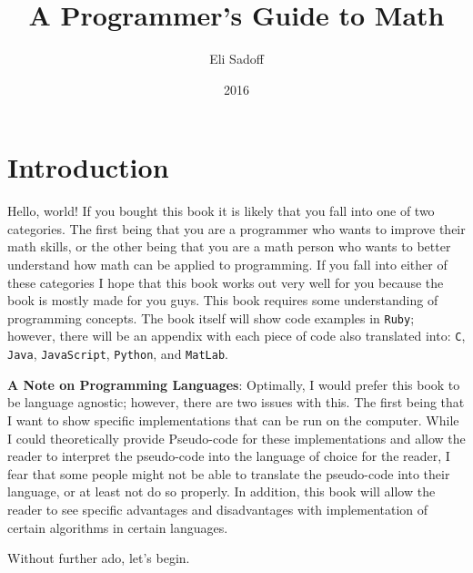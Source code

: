\documentclass{book}
\title{A Programmer's Guide to Math}
\author{Eli Sadoff}
\date{2016}
\begin{document}
\maketitle

\chapter[0]{Introduction}
Hello, world! If you bought this book it is likely that you fall into one of two categories.
The first being that you are a programmer who wants to improve their math skills, or the other
being that you are a math person who wants to better understand how math can be applied to 
programming. If you fall into either of these categories I hope that this book works out very
well for you because the book is mostly made for you guys. This book requires some understanding 
of programming concepts. The book itself will show code examples in {\tt Ruby}; however, there 
will be an appendix with each piece of code also translated into: {\tt C}, {\tt Java}, 
{\tt JavaScript}, {\tt Python}, and {\tt MatLab}.

{\bf A Note on Programming Languages}: Optimally, I would prefer this book to be language
agnostic; however, there are two issues with this. The first being that I want to show specific
implementations that can be run on the computer. While I could theoretically provide Pseudo-code 
for these implementations and allow the reader to interpret the pseudo-code into the language 
of choice for the reader, I fear that some people might not be able to translate the pseudo-code
into their language, or at least not do so properly. In addition, this book will allow the reader
to see specific advantages and disadvantages with implementation of certain algorithms in certain
languages. 

Without further ado, let's begin.
\end{document}
